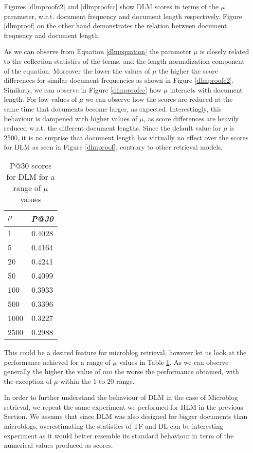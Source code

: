 Figures \ref{dlmproofc2} and \ref{dlmproofcc} show DLM scores in terms of the $\mu$ parameter, w.r.t. document frequency and document length respectively. Figure \ref{dlmproof} on the other hand demonstrates the relation between document frequency and document length.

As we can observe from Equation \ref{dlmequation} the parameter $\mu$ is closely related to the collection statistics of the terms, and the length normalization component of the equation. Moreover the lower the values of $\mu$ the higher the score differences for similar document frequencies as shown in Figure \ref{dlmproofc2}. Similarly, we can observe in Figure \ref{dlmproofcc} how $\mu$ interacts with document length. For low values of $\mu$ we can observe how the scores are reduced at the same time that documents become larger, as expected. Interestingly, this behaviour is dampened with higher values of $\mu$, as score differences are heavily reduced w.r.t. the different document lengths. Since the default value for $\mu$ is 2500, it is no surprise that document length has virtually no effect over the scores for DLM  as seen in Figure \ref{dlmproof}, contrary to other retrieval models. 

\begin{table}[]

	\caption{P@30 scores for DLM for a range of $\mu$ values}
	\centering
	\begin{tabular}{l|c} 	
	\textit{\textbf{$\mu$}} & 
	\textit{\textbf{P@30}} 	
	\tabularnewline
	\hline
	1 & 0.4028 \\
	5 &  0.4164 \\
	20 & 0.4241 \\
	50 &  0.4099 \\
	100 &  0.3933 \\
	500 &  0.3396 \\
	1000 & 0.3227 \\
	2500 & 0.2988 \\
	\hline	
	\end{tabular}
	\label{drmmuvalues}
\end{table}

This could be a desired feature for microblog retrieval, however let us look at the performance achieved for a range of $\mu$ values in Table \ref{drmmuvalues}. As we can observe generally the higher the value of $mu$ the worse the performance obtained, with the exception of $\mu$ within the 1 to 20 range. 

In order to further understand the behaviour of DLM in the case of Microblog retrieval, we repeat the same experiment we performed for HLM in the previous Section. We assume that since DLM was also designed for bigger documents than microblogs, overestimating the statistics of TF and DL can be interesting experiment as it would better resemble its standard behaviour in term of the numerical values produced as scores. 

